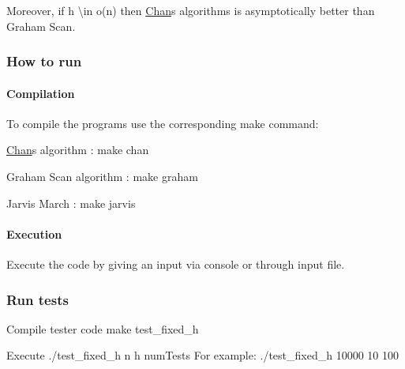 Moreover, if {\ttfamily h \textbackslash{}in o(n)} then \mbox{\hyperlink{classChan}{Chan}}\textquotesingle{}s algorithms is asymptotically better than {\ttfamily Graham Scan}.

\subsubsection*{How to run}

\paragraph*{Compilation}

To compile the programs use the corresponding make command\+:
\begin{DoxyEnumerate}
\item \mbox{\hyperlink{classChan}{Chan}}\textquotesingle{}s algorithm \+: {\ttfamily make chan}
\item Graham Scan algorithm \+: {\ttfamily make graham}
\item Jarvis March \+: {\ttfamily make jarvis}
\end{DoxyEnumerate}

\paragraph*{Execution}

Execute the code by giving an input via console or through input file.


\begin{DoxyCode}{0}
\end{DoxyCode}


\subsubsection*{Run tests}


\begin{DoxyEnumerate}
\item Compile tester code {\ttfamily make test\+\_\+fixed\+\_\+h}
\item Execute {\ttfamily ./test\+\_\+fixed\+\_\+h n h num\+Tests} For example\+: {\ttfamily ./test\+\_\+fixed\+\_\+h 10000 10 100} 
\end{DoxyEnumerate}